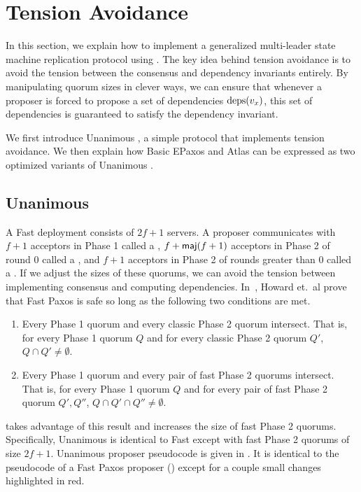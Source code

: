 \section{Tension Avoidance}
In this section, we explain how to implement a generalized multi-leader state
machine replication protocol using . The key idea
behind tension avoidance is to avoid the tension between the consensus and
dependency invariants entirely. By manipulating quorum sizes in clever ways, we
can ensure that whenever a proposer is forced to propose a set of dependencies
$\text{deps}(v_x)$, this set of dependencies is guaranteed to satisfy the dependency
invariant.

We first introduce Unanimous \BPaxos{}, a simple protocol that implements
tension avoidance. We then explain how Basic EPaxos and Atlas can be expressed
as two optimized variants of Unanimous \BPaxos{}.

\subsection{Unanimous \BPaxos{}}
A Fast \BPaxos{} deployment consists of $2f+1$ servers. A proposer communicates
with $f+1$ acceptors in Phase 1 called a , $f +
\textsf{maj}(f+1)$ acceptors in Phase 2 of round $0$ called a , and $f + 1$ acceptors in Phase 2 of rounds greater than $0$ called a
. If we adjust the sizes of these quorums, we
can avoid the tension between implementing consensus and computing
dependencies.
%
In~\cite{howard2021fast}, Howard et.\ al prove that Fast Paxos is safe so long
as the following two conditions are met.
\begin{enumerate}
  \item
    Every Phase 1 quorum and every classic Phase 2 quorum intersect. That is,
    for every Phase 1 quorum $Q$ and for every classic Phase 2 quorum $Q'$, $Q
    \cap Q' \neq \emptyset$.

  \item
    Every Phase 1 quorum and every pair of fast Phase 2 quorums intersect. That
    is, for every Phase 1 quorum $Q$ and for every pair of fast Phase 2 quorum
    $Q', Q''$, $Q \cap Q' \cap Q'' \neq \emptyset$.
\end{enumerate}

 takes advantage of this result and increases the
size of fast Phase 2 quorums. Specifically, Unanimous \BPaxos{} is identical
to Fast \BPaxos{} except with fast Phase 2 quorums of size $2f+1$. Unanimous
\BPaxos{} proposer pseudocode is given in . It
is identical to the pseudocode of a Fast Paxos proposer
() except for a couple small changes highlighted in
red.

